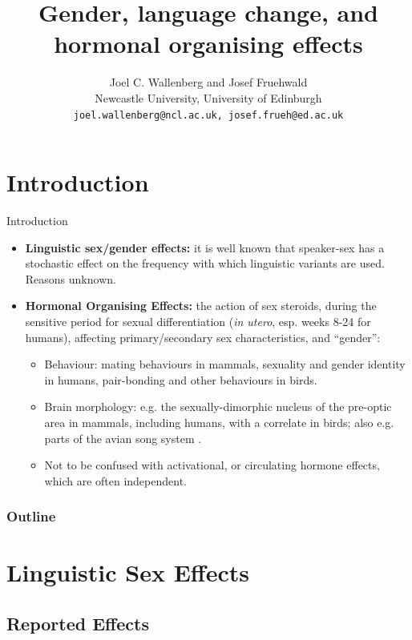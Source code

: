 \documentclass[hyperref={pdfpagelabels=false}]{beamer}
\title{Gender, language change, and hormonal organising effects}
\author{Joel C. Wallenberg and Josef Fruehwald\\Newcastle University, University of Edinburgh\\\texttt{joel.wallenberg@ncl.ac.uk, josef.frueh@ed.ac.uk}}
\begin{document}
\begin{frame}[plain]
\titlepage
\end{frame}


\section{Introduction}
\begin{frame}{Introduction}

	
	\begin{itemize}
		\item \textbf{Linguistic sex/gender effects:} it is well known that speaker-sex has a stochastic effect on the frequency with which linguistic variants are used. Reasons unknown.
		\item \textbf{Hormonal Organising Effects:} the action of sex steroids, during the sensitive period for sexual differentiation 
		(\textsl{in utero}, esp. weeks 8-24 for humans), affecting primary/secondary sex characteristics, and ``gender'':
			\begin{itemize}
				\item Behaviour: mating behaviours in mammals, sexuality and gender identity in humans, pair-bonding and other behaviours in birds.
				\item Brain morphology: e.g. the sexually-dimorphic nucleus of the pre-optic area in mammals, including humans, with a correlate in birds; also e.g. parts of the avian song system \citep[][]{balthazartetal2009}.
				\item Not to be confused with activational, or circulating hormone effects, which are often independent.
			\end{itemize}
	\end{itemize}
	
\end{frame}


\begin{frame}
\frametitle{Outline}
\tableofcontents
\end{frame}


\section{Linguistic Sex Effects}
\subsection{Reported Effects}
\end{document}
